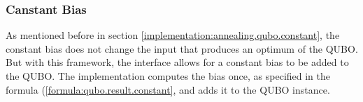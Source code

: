 \subsubsection{Canstant Bias}

As mentioned before in section \ref{implementation:annealing.qubo.constant}, the constant bias does not change the input that produces an optimum of the QUBO.
But with this framework, the interface allows for a constant bias to be added to the QUBO.
The implementation computes the bias once, as specified in the formula (\ref{formula:qubo.result.constant}, and adds it to the QUBO instance.
